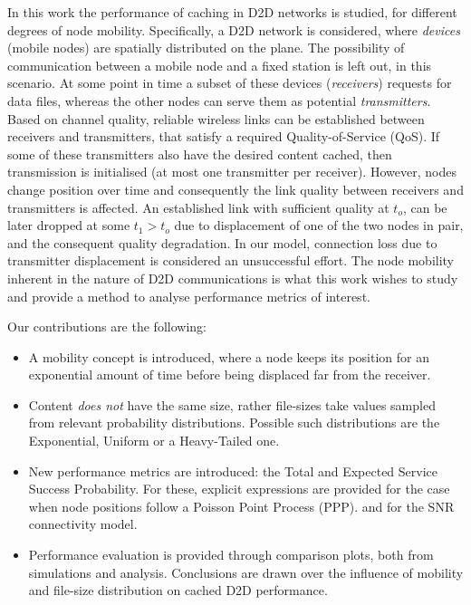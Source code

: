 \documentclass[conference]{IEEEtran}
\begin{document}
In this work the performance of caching in D2D networks is studied, for different degrees of node mobility. Specifically, a D2D network is considered, where \textit{devices} (mobile nodes) are spatially distributed on the plane. The possibility of communication between a mobile node and a fixed station is left out, in this scenario. At some point in time a subset of these devices (\textit{receivers}) requests for data files, whereas the other nodes can serve them as potential \textit{transmitters}. Based on channel quality, reliable wireless links can be established between receivers and transmitters, that satisfy a required Quality-of-Service (QoS). If some of these transmitters also have the desired content cached, then transmission is initialised (at most one transmitter per receiver). However, nodes change position over time and consequently the link quality between receivers and transmitters is affected. An established link with sufficient quality at $t_o$, can be later dropped at some $t_1>t_o$ due to displacement of one of the two nodes in pair, and the consequent quality degradation.  In our model, connection loss due to transmitter displacement is considered an unsuccessful effort. The node mobility inherent in the nature of D2D communications is what this work wishes to study and provide a method to analyse performance metrics of interest.

Our contributions are the following:

\begin{itemize}
\item A mobility concept is introduced, where a node keeps its position for an exponential amount of time before being displaced far from the receiver. 
\item Content \textit{does not} have the same size, rather file-sizes take values sampled from relevant probability distributions. Possible such distributions are the Exponential, Uniform or a Heavy-Tailed one. 
\item New performance metrics are introduced: the Total and Expected Service Success Probability. For these, explicit expressions are provided for the case when node positions follow a Poisson Point Process (PPP). and for the $\mathrm{SNR}$ connectivity model. 
\item Performance evaluation is provided through comparison plots, both from simulations and analysis. Conclusions are drawn over the influence of mobility and file-size distribution on cached D2D performance. 
\end{itemize}
\end{document}

